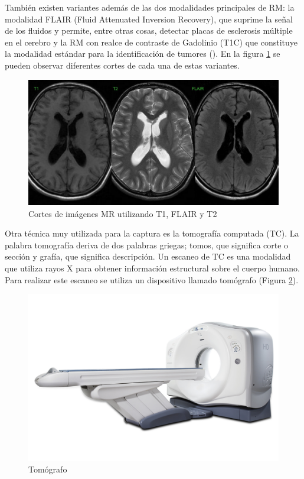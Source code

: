También existen variantes además de las dos modalidades principales de RM: la modalidad FLAIR (Fluid Attenuated Inversion Recovery), que suprime la señal de los fluidos y permite, entre otras cosas, detectar placas de esclerosis múltiple en el cerebro y la RM con realce de contraste de Gadolinio (T1C) que constituye la modalidad estándar para la identificación de tumores (\citep{scarabino2012imaging}). En la figura \ref{fig:mri_cortes} se pueden observar diferentes cortes de cada una de estas variantes.

\begin{figure}[H]
\centering
\includegraphics[scale=0.2]{images/t1_t2_flair.jpg}
\caption{Cortes de imágenes MR utilizando T1, FLAIR y T2}
\label{fig:mri_cortes}
\end{figure}

Otra técnica muy utilizada para la captura es la tomografía computada (TC). La palabra tomografía deriva de dos palabras griegas; tomos, que significa corte o sección y grafía, que significa descripción. Un escaneo de TC es una modalidad que utiliza rayos X para obtener información estructural sobre el cuerpo humano. Para realizar este escaneo se utiliza un dispositivo llamado tomógrafo (Figura \ref{fig:tomografo}).

\begin{figure}[H]
\centering
\includegraphics[scale=0.5]{images/ge_ct_scanner.jpg}
\caption{Tomógrafo}
\label{fig:tomografo}
\end{figure}

